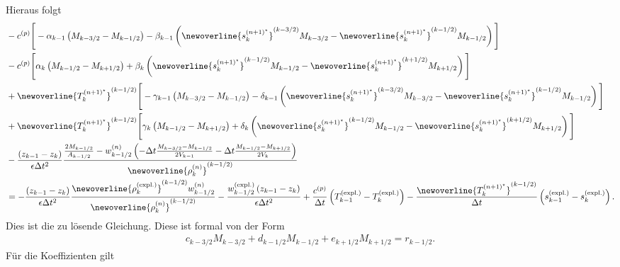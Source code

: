 %
Hieraus folgt
%
\begin{align}
&-c^{(p)}\Bigg[-\alpha_{k - 1}\left(M_{k - 3/2} - M_{k - 1/2}\right) - \beta_{k - 1}\left(\newoverline{s_k^{(n + 1)^\star}}^{(k - 3/2)}M_{k - 3/2} - \newoverline{s_k^{(n + 1)^\star}}^{(k - 1/2)}M_{k - 1/2}\right)\Bigg]\nonumber\\
&-c^{(p)}\Bigg[\alpha_k\left(M_{k - 1/2} - M_{k + 1/2}\right) + \beta_k\left(\newoverline{s_k^{(n + 1)^\star}}^{(k - 1/2)}M_{k - 1/2} - \newoverline{s_k^{(n + 1)^\star}}^{(k + 1/2)}M_{k + 1/2}\right)\Bigg]\nonumber\\
&+ \newoverline{T_k^{(n + 1)^\star}}^{(k - 1/2)}\Bigg[-\gamma_{k - 1}\left(M_{k - 3/2} - M_{k - 1/2}\right) - \delta_{k - 1}\left(\newoverline{s_k^{(n + 1)^\star}}^{(k - 3/2)}M_{k - 3/2} - \newoverline{s_k^{(n + 1)^\star}}^{(k - 1/2)}M_{k - 1/2}\right)\Bigg]\nonumber\\
&+ \newoverline{T_k^{(n + 1)^\star}}^{(k - 1/2)}\Bigg[\gamma_k\left(M_{k - 1/2} - M_{k + 1/2}\right) + \delta_k\left(\newoverline{s_k^{(n + 1)^\star}}^{(k - 1/2)}M_{k - 1/2} - \newoverline{s_k^{(n + 1)^\star}}^{(k + 1/2)}M_{k + 1/2}\right)\Bigg]\nonumber\\
&- \frac{\left(z_{k - 1} - z_k\right)}{\epsilon\Delta t^2}\frac{\frac{2M_{k - 1/2}}{A_{k - 1/2}} - w^{(n)}_{k - 1/2}\left(-\Delta t\frac{M_{k - 3/2} - M_{k - 1/2}}{2V_{k - 1}} - \Delta t\frac{M_{k - 1/2} - M_{k + 1/2}}{2V_k}\right)}{\newoverline{\rho_k^{(n)}}^{(k - 1/2)}}\nonumber\\
&= -\frac{\left(z_{k - 1} - z_k\right)}{\epsilon\Delta t^2}\frac{\newoverline{\rho_k^{(\text{expl.})}}^{(k - 1/2)}w^{(n)}_{k - 1/2}}{\newoverline{\rho_k^{(n)}}^{(k - 1/2)}} -\frac{w_{k - 1/2}^{(\text{expl.})}\left(z_{k - 1} - z_k\right)}{\epsilon\Delta t^2} + \frac{c^{(p)}}{\Delta t}\left(T^{(\text{expl.})}_{k - 1} - T^{(\text{expl.})}_{k}\right) - \frac{\newoverline{T_k^{(n + 1)^\star}}^{(k - 1/2)}}{\Delta t}\left(s^{(\text{expl.})}_{k - 1} - s^{(\text{expl.})}_k\right).
\end{align}
%
Dies ist die zu lösende Gleichung. Diese ist formal von der Form
%
\begin{align}
c_{k - 3/2}M_{k - 3/2} + d_{k - 1/2}M_{k - 1/2} + e_{k + 1/2}M_{k + 1/2} = r_{k - 1/2}.
\end{align}
%
Für die Koeffizienten gilt
%
